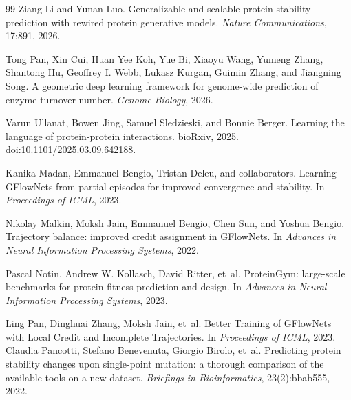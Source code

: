 \documentclass[11pt]{article}
\begin{document}
\begin{thebibliography}{99}
		Ziang Li and Yunan Luo.
		\newblock Generalizable and scalable protein stability prediction with rewired protein generative models.
		\newblock \emph{Nature Communications}, 17:891, 2026.
		
		Tong Pan, Xin Cui, Huan Yee Koh, Yue Bi, Xiaoyu Wang, Yumeng Zhang, Shantong Hu, Geoffrey I. Webb, Lukasz Kurgan, Guimin Zhang, and Jiangning Song.
		\newblock A geometric deep learning framework for genome-wide prediction of enzyme turnover number.
		\newblock \emph{Genome Biology}, 2026.
		
		
		Varun Ullanat, Bowen Jing, Samuel Sledzieski, and Bonnie Berger.
		\newblock Learning the language of protein-protein interactions.
		\newblock bioRxiv, 2025. doi:10.1101/2025.03.09.642188.
		
		Kanika Madan, Emmanuel Bengio, Tristan Deleu, and collaborators.
		\newblock Learning GFlowNets from partial episodes for improved convergence and stability.
		\newblock In \emph{Proceedings of ICML}, 2023.
		
		Nikolay Malkin, Moksh Jain, Emmanuel Bengio, Chen Sun, and Yoshua Bengio.
		\newblock Trajectory balance: improved credit assignment in GFlowNets.
		\newblock In \emph{Advances in Neural Information Processing Systems}, 2022.
		
		Pascal Notin, Andrew W. Kollasch, David Ritter, et~al.
		\newblock ProteinGym: large-scale benchmarks for protein fitness prediction and design.
		\newblock In \emph{Advances in Neural Information Processing Systems}, 2023.
		
		Ling Pan, Dinghuai Zhang, Moksh Jain, et~al.
		\newblock Better Training of GFlowNets with Local Credit and Incomplete Trajectories.
		\newblock In \emph{Proceedings of ICML}, 2023.
		Claudia Pancotti, Stefano Benevenuta, Giorgio Birolo, et~al.
		\newblock Predicting protein stability changes upon single-point mutation: a thorough comparison of the available tools on a new dataset.
		\newblock \emph{Briefings in Bioinformatics}, 23(2):bbab555, 2022.
		

\end{thebibliography}
\end{document}

